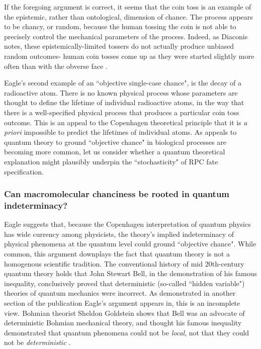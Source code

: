 \documentclass{ut-thesis}
\begin{document}
\begin{NoHyper}
If the foregoing argument is correct, it seems that the coin toss is an example of the epistemic, rather than ontological, dimension of chance. The process appears to be chancy, or random, because the human tossing the coin is not able to precisely control the mechanical parameters of the process. Indeed, as Diaconis notes, these epistemically-limited tossers do not actually produce unbiased random outcomes- human coin tosses come up as they were started slightly more often than with the obverse face \cite{Diaconis2007}.

Eagle's second example of an ``objective single-case chance", is the decay of a radioactive atom. There is no known physical process whose parameters are thought to define the lifetime of individual radioactive atoms, in the way that there is a well-specified physical process that produces a particular coin toss outcome. This is an appeal to the Copenhagen theoretical principle that it is \textit{a priori} impossible to predict the lifetimes of individual atoms. As appeals to quantum theory to ground ``objective chance" in biological processes are becoming more common, let us consider whether a quantum theoretical explanation might plausibly underpin the ``stochasticity" of RPC fate specification.

\subsubsection{Can macromolecular chanciness be rooted in quantum indeterminacy?}
Eagle suggests that, because the Copenhagen interpretation of quantum physics has wide currency among physicists, the theory's implied indeterminacy of physical phenomena at the quantum level could ground ``objective chance". While common, this argument downplays the fact that quantum theory is not a homogenous scientific tradition. The conventional history of mid 20th-century quantum theory holds that John Stewart Bell, in the demonstration of his famous inequality, conclusively proved that deterministic (so-called ``hidden variable") theories of quantum mechanics were incorrect. As demonstrated in another section of the publication Eagle's argument appears in, this is an incomplete view. Bohmian theorist Sheldon Goldstein shows that Bell was an advocate of deterministic Bohmian mechanical theory, and thought his famous inequality demonstrated that quantum phenomena could not be \textit{local}, not that they could not be \textit{deterministic} \cite{Goldstein2017}.


\end{NoHyper}
\end{document}
